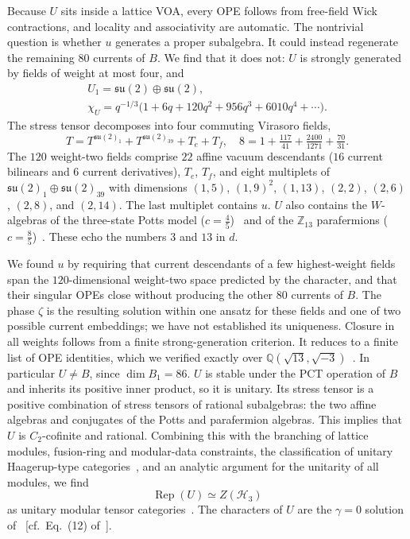 \documentclass[aps,prl,twocolumn,superscriptaddress,nofootinbib]{revtex4-2}
\newcommand{\cH}{\mathcal H}
\newcommand{\su}{\mathfrak{su}}
\newcommand{\Rep}{\operatorname{Rep}}
\begin{document}
Because $U$ sits inside a lattice VOA, every OPE follows from free-field
Wick contractions, and locality and associativity are automatic. The
nontrivial question is whether $u$ generates a proper subalgebra. It
could instead regenerate the remaining $80$ currents of $B$. We find
that it does not: $U$ is strongly generated by fields of weight at most
four, and
\begin{equation}
 \begin{gathered}
 U_1=\su(2)\oplus\su(2),\\
 \chi_U=q^{-1/3}\bigl(1+6q+120q^2+956q^3+6010q^4+\cdots\bigr).
 \end{gathered}
 \label{eq:charU}
\end{equation}
The stress tensor decomposes into four commuting Virasoro fields,
\begin{equation}
 T=T^{\su(2)_1}+T^{\su(2)_{39}}+T_e+T_f,\quad
 8=1+\tfrac{117}{41}+\tfrac{2400}{1271}+\tfrac{70}{31}.
 \label{eq:Tsplit}
\end{equation}
The $120$ weight-two fields comprise $22$ affine vacuum descendants
($16$ current bilinears and $6$ current derivatives), $T_e$, $T_f$, and
eight multiplets of $\su(2)_1\oplus\su(2)_{39}$ with
dimensions $(1,5)$, $(1,9)^2$, $(1,13)$, $(2,2)$, $(2,6)$, $(2,8)$,
and $(2,14)$. The last multiplet contains $u$. $U$ also contains the
$W$-algebras of the three-state Potts model ($c=\tfrac45$)~\cite{FZ3}
and of the $\mathbb Z_{13}$ parafermions
($c=\tfrac85$)~\cite{ZF}. These echo the numbers $3$ and $13$ in $d$.

We found $u$ by requiring that current descendants of a few
highest-weight fields span the $120$-dimensional weight-two space
predicted by the character, and that their singular OPEs close without
producing the other $80$ currents of $B$. The phase $\zeta$ is the
resulting solution within one ansatz for these fields and one of two
possible current embeddings; we have not established its uniqueness. Closure
in all weights follows from a finite
strong-generation criterion. It reduces to a finite list of OPE
identities, which we verified exactly over
$\mathbb Q(\sqrt{13},\sqrt{-3})$~\cite{companion}. In particular $U\ne B$,
since $\dim B_1=86$. $U$ is stable under the PCT operation of $B$ and
inherits its positive inner product, so it is unitary. Its stress tensor is a positive combination of stress
tensors of rational subalgebras: the two affine algebras and conjugates
of the Potts and parafermion algebras. This implies that $U$ is $C_2$-cofinite and
rational. Combining this with the branching of lattice modules,
fusion-ring and modular-data constraints, the classification of unitary
Haagerup-type categories~\cite{Izumi,GS}, and an analytic argument for
the unitarity of all modules, we find
\begin{equation}
 \Rep(U)\simeq Z(\cH_3)
 \label{eq:RepU}
\end{equation}
as unitary modular tensor categories~\cite{companion}. The characters of $U$ are the
$\gamma=0$ solution of~\cite{EG} [cf.\ Eq.~(12) of~\cite{AHKZ}].
\end{document}
